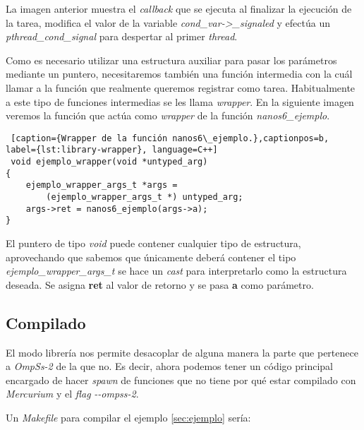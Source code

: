 La imagen anterior muestra el \textit{callback} que se ejecuta al finalizar la ejecución de la tarea, modifica el valor de la variable \textit{cond\_var->\_signaled} y efectúa un \textit{pthread\_cond\_signal} para despertar al primer \textit{thread}.

\par\bigskip

Como es necesario utilizar una estructura auxiliar para pasar los parámetros mediante un puntero, necesitaremos también una función intermedia con la cuál llamar a la función que realmente queremos registrar como tarea. Habitualmente a este tipo de funciones intermedias se les llama \textit{wrapper}. En la siguiente imagen veremos la función que actúa como \textit{wrapper} de la función \textit{nanos6\_ejemplo}. \smallskip

\begin{minipage}{\linewidth}
\begin{lstlisting} [caption={Wrapper de la función nanos6\_ejemplo.},captionpos=b, label={lst:library-wrapper}, language=C++]
 void ejemplo_wrapper(void *untyped_arg)
{
    ejemplo_wrapper_args_t *args = 
        (ejemplo_wrapper_args_t *) untyped_arg;
    args->ret = nanos6_ejemplo(args->a);
}
\end{lstlisting}
\end{minipage}

El puntero de tipo \textit{void} puede contener cualquier tipo de estructura, aprovechando que sabemos que únicamente deberá contener el tipo \textit{ejemplo\_wrapper\_args\_t} se hace un \textit{cast} para interpretarlo como la estructura deseada. Se asigna \textbf{ret} al valor de retorno y se pasa \textbf{a} como parámetro.

\subsection{Compilado}
\label{sec:compilado}

El modo librería nos permite desacoplar de alguna manera la parte que pertenece a \textit{OmpSs-2} de la que no. Es decir, ahora podemos tener un código principal encargado de hacer \textit{spawn} de funciones que no tiene por qué estar compilado con \textit{Mercurium} y el \textit{flag} \textit{-{}-ompss-2}.
\par\bigskip

Un \textit{Makefile} para compilar el ejemplo \ref{sec:ejemplo} sería:
\medskip

